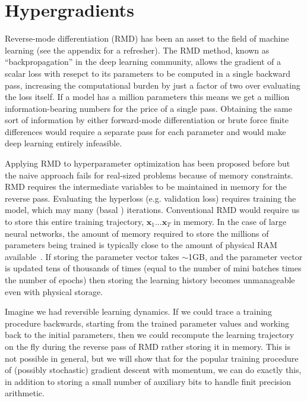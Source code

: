\documentclass{article}
\newcommand{\vx}{\mathbf{x}}
\newcommand{\primal}{basal }
\newcommand{\params}{\vx}
\begin{document}
\section{Hypergradients}
\label{sec:hypergradients}

Reverse-mode differentiation (RMD) has been an asset to the field of machine
learning (see the appendix for a refresher). The RMD method, known as
``backpropagation'' in the deep learning community, allows the gradient of a
scalar loss with resepct to its parameters to be computed in a single backward
pass, increasing the computational burden by just a factor of two over
evaluating the loss itself. If a model has a million parameters this means we
get a million information-bearing numbers for the price of a single
pass. Obtaining the same sort of information by either forward-mode
differentiation or brute force finite differences would require a separate pass
for each parameter and would make deep learning entirely infeasible.

Applying RMD to hyperparameter optimization has been proposed before
\citet{Autodiff14} but the naive approach fails for real-sized problems because
of memory constraints. RMD requires the intermediate variables to be maintained
in memory for the reverse pass. Evaluating the hyperloss (e.g. validation loss)
requires training the model, which may many (\primal) iterations. Conventional
RMD would require us to store this entire training trajectory, $\params_1
... \params_T$ in memory.  In the case of large neural networks, the amount of
memory required to store the millions of parameters being trained is typically
close to the amount of physical RAM available~\cite{sequence2014}. If storing
the parameter vector takes $\sim$1GB, and the parameter vector is updated tens
of thousands of times (equal to the number of mini batches times the number of
epochs) then storing the learning history becomes unmanageable even with
physical storage.

Imagine we had reversible learning dynamics. If we could trace a training
procedure backwards, starting from the trained parameter values and working
back to the initial parameters, then we could recompute the learning trajectory
on the fly during the reverse pass of RMD rather storing it in memory. This is
not possible in general, but we will show that for the popular training
procedure of (possibly stochastic) gradient descent with momentum, we can do
exactly this, in addition to storing a small number of auxiliary bits to handle
finit precision arithmetic.
\end{document}
